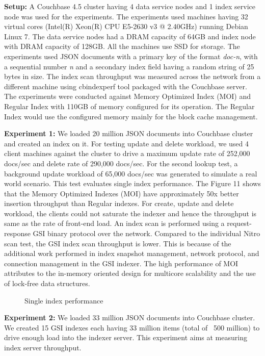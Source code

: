 \documentclass{vldb}
\begin{document}
\textbf{Setup:} A Couchbase 4.5 cluster having 4 data service nodes and 1 index service node was used for the experiments. The experiments used machines having 32 virtual cores (Intel(R) Xeon(R) CPU E5-2630 v3 @ 2.40GHz) running Debian Linux 7. The data service nodes had a DRAM capacity of 64GB and index node with DRAM capacity of 128GB. All the machines use SSD for storage. The experiments used JSON documents with a primary key of the format \textit{doc-n}, with a sequential number \textit{n} and a secondary index field having a random string of 25 bytes in size. The index scan throughput was measured across the network from a different machine using cbindexperf tool packaged with the Couchbase server. The experiments were conducted against Memory Optimized Index (MOI) and Regular Index with 110GB of memory configured for its operation. The Regular Index would use the configured memory mainly for the block cache management.

\textbf{Experiment 1:} We loaded 20 million JSON documents into Couchbase cluster and created an index on it. For testing update and delete workload, we used 4 client machines against the cluster to drive a maximum update rate of 252,000 docs/sec and delete rate of 290,000 docs/sec. For the second lookup test, a background update workload of 65,000 docs/sec was generated to simulate a real world scenario. This test evaluates single index performance. The Figure 11 shows that the Memory Optimized Indexes (MOI) have approximately 50x better insertion throughput than Regular indexes. For create, update and delete workload, the clients could not saturate the indexer and hence the throughput is same as the rate of front-end load. An index scan is performed using a request-response GSI binary protocol over the network. Compared to the individual Nitro scan test, the GSI index scan throughput is lower. This is because of the additional work performed in index snapshot management, network protocol, and connection management in the GSI indexer. The high performance of MOI attributes to the in-memory oriented design for multicore scalability and the use of lock-free data structures.


\begin{figure}[h]

\caption{Single index performance}
\end{figure}



\textbf{Experiment 2:}  We loaded 33 million JSON documents into Couchbase cluster. We created 15 GSI indexes each having 33 million items (total of ~500 million) to drive enough load into the indexer server. This experiment aims at measuring index server throughput.
\end{document}
